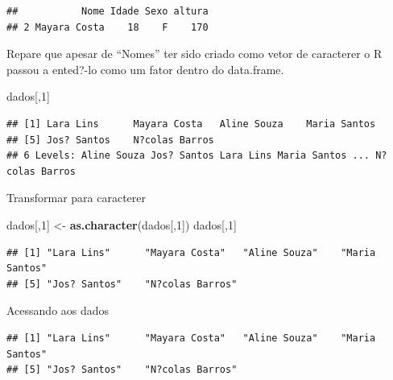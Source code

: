 \documentclass[]{book}
\newenvironment{Shaded}{\begin{snugshade}}{\end{snugshade}}
\newcommand{\DecValTok}[1]{\textcolor[rgb]{0.00,0.00,0.81}{#1}}
\newcommand{\KeywordTok}[1]{\textcolor[rgb]{0.13,0.29,0.53}{\textbf{#1}}}
\newcommand{\NormalTok}[1]{#1}
\newcommand{\OperatorTok}[1]{\textcolor[rgb]{0.81,0.36,0.00}{\textbf{#1}}}
\newcommand{\StringTok}[1]{\textcolor[rgb]{0.31,0.60,0.02}{#1}}
\begin{document}
\begin{verbatim}
##           Nome Idade Sexo altura
## 2 Mayara Costa    18    F    170
\end{verbatim}

Repare que apesar de ``Nomes'' ter sido criado como vetor de caracterer o R passou a ented?-lo como um fator dentro do data.frame.

\begin{Shaded}
\begin{Highlighting}[]
\NormalTok{dados[,}\DecValTok{1}\NormalTok{]}
\end{Highlighting}
\end{Shaded}

\begin{verbatim}
## [1] Lara Lins      Mayara Costa   Aline Souza    Maria Santos  
## [5] Jos? Santos    N?colas Barros
## 6 Levels: Aline Souza Jos? Santos Lara Lins Maria Santos ... N?colas Barros
\end{verbatim}

Transformar para caracterer

\begin{Shaded}
\begin{Highlighting}[]
\NormalTok{dados[,}\DecValTok{1}\NormalTok{] <-}\StringTok{ }\KeywordTok{as.character}\NormalTok{(dados[,}\DecValTok{1}\NormalTok{])}
\NormalTok{dados[,}\DecValTok{1}\NormalTok{]}
\end{Highlighting}
\end{Shaded}

\begin{verbatim}
## [1] "Lara Lins"      "Mayara Costa"   "Aline Souza"    "Maria Santos"  
## [5] "Jos? Santos"    "N?colas Barros"
\end{verbatim}

Acessando aos dados

\begin{Shaded}
\end{Shaded}

\begin{verbatim}
## [1] "Lara Lins"      "Mayara Costa"   "Aline Souza"    "Maria Santos"  
## [5] "Jos? Santos"    "N?colas Barros"
\end{verbatim}

\begin{Shaded}
\end{Shaded}
\end{document}

